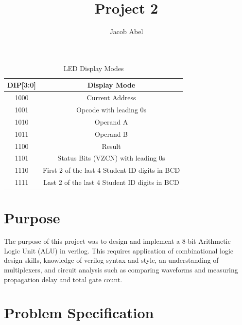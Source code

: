 \documentclass[12pt,letterpaper,titlepage]{article}
\author{Jacob Abel}
\title{Project 2}
\begin{document}
\maketitle


\tableofcontents
\pagebreak
\listoftables

\listoffigures

\pagebreak
\begin{raggedright}

\begin{table}
\centering
\begin{tabular}{|c|c|}                                      \hline
DIP[3:0] & Display Mode                                   \\\hline\hline
1000     & Current Address                                \\\hline
1001     & Opcode with leading 0s                         \\\hline
1010     & Operand A                                      \\\hline
1011     & Operand B                                      \\\hline
1100     & Result                                         \\\hline
1101     & Status Bits (VZCN) with leading 0s             \\\hline
1110     & First 2 of the last 4 Student ID digits in BCD \\\hline
1111     & Last 2 of the last 4 Student ID digits in BCD  \\\hline
\end{tabular}
\caption{LED Display Modes}\label{ledmode}
\end{table}

\section{Purpose}
The purpose of this project was to design and implement a 8-bit Arithmetic Logic Unit (ALU) in verilog. This requires application of combinational logic design skills, knowledge of verilog syntax and style, an understanding of multiplexers, and circuit analysis such as comparing waveforms and measuring propagation delay and total gate count.

\section{Problem Specification}


\end{raggedright}
\end{document}
